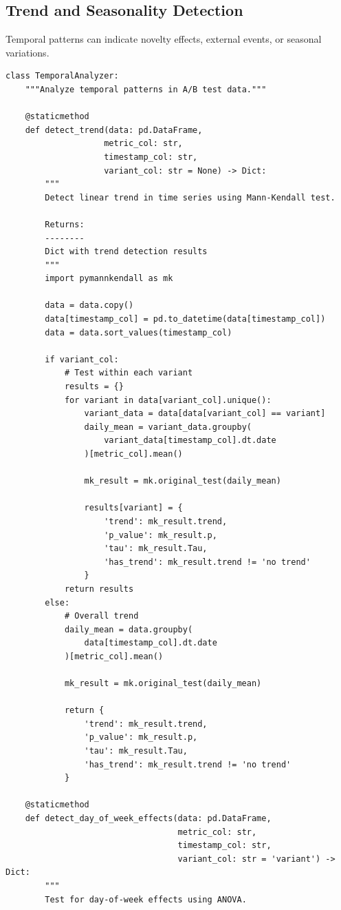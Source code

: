 \subsection{Trend and Seasonality Detection}

Temporal patterns can indicate novelty effects, external events, or seasonal variations.

\lstset{language=Python, caption=Temporal Pattern Detection}
\begin{lstlisting}
class TemporalAnalyzer:
    """Analyze temporal patterns in A/B test data."""

    @staticmethod
    def detect_trend(data: pd.DataFrame,
                    metric_col: str,
                    timestamp_col: str,
                    variant_col: str = None) -> Dict:
        """
        Detect linear trend in time series using Mann-Kendall test.

        Returns:
        --------
        Dict with trend detection results
        """
        import pymannkendall as mk

        data = data.copy()
        data[timestamp_col] = pd.to_datetime(data[timestamp_col])
        data = data.sort_values(timestamp_col)

        if variant_col:
            # Test within each variant
            results = {}
            for variant in data[variant_col].unique():
                variant_data = data[data[variant_col] == variant]
                daily_mean = variant_data.groupby(
                    variant_data[timestamp_col].dt.date
                )[metric_col].mean()

                mk_result = mk.original_test(daily_mean)

                results[variant] = {
                    'trend': mk_result.trend,
                    'p_value': mk_result.p,
                    'tau': mk_result.Tau,
                    'has_trend': mk_result.trend != 'no trend'
                }
            return results
        else:
            # Overall trend
            daily_mean = data.groupby(
                data[timestamp_col].dt.date
            )[metric_col].mean()

            mk_result = mk.original_test(daily_mean)

            return {
                'trend': mk_result.trend,
                'p_value': mk_result.p,
                'tau': mk_result.Tau,
                'has_trend': mk_result.trend != 'no trend'
            }

    @staticmethod
    def detect_day_of_week_effects(data: pd.DataFrame,
                                   metric_col: str,
                                   timestamp_col: str,
                                   variant_col: str = 'variant') -> Dict:
        """
        Test for day-of-week effects using ANOVA.


\end{lstlisting}
